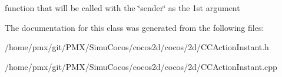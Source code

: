 function that will be called with the \char`\"{}sender\char`\"{} as the 1st argument 

The documentation for this class was generated from the following files\+:\begin{DoxyCompactItemize}
\item 
/home/pmx/git/\+P\+M\+X/\+Simu\+Cocos/cocos2d/cocos/2d/C\+C\+Action\+Instant.\+h\item 
/home/pmx/git/\+P\+M\+X/\+Simu\+Cocos/cocos2d/cocos/2d/C\+C\+Action\+Instant.\+cpp\end{DoxyCompactItemize}
